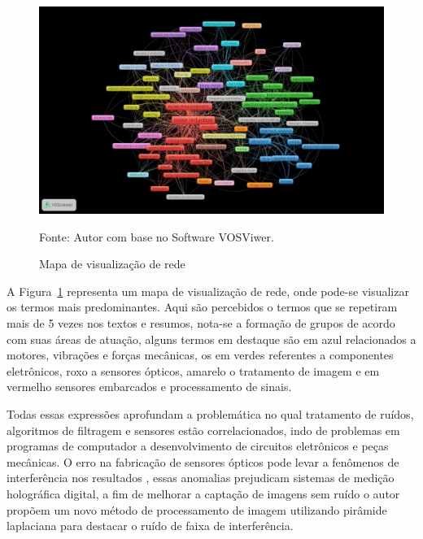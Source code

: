 \begin{figure}[H]
	\centering
	\includegraphics[width=15cm]{anexos/ris/IEEE/Noise_reduction_and_noise_abatement_andsensor_filtering_algorithm/network_visualization_with_lines.png}
	\caption{Mapa de visualização de rede}
	Fonte: Autor com base no Software VOSViwer.
	\label{fig: network_visualization_with_lines}
\end{figure}

A Figura~\ref{fig: network_visualization_with_lines} representa um mapa de visualização de rede, onde pode-se visualizar os termos mais predominantes. Aqui são percebidos o termos que se repetiram mais de 5 vezes nos textos e resumos, nota-se a formação de grupos de acordo com suas áreas de atuação, alguns termos em destaque são em azul relacionados a motores, vibrações e forças mecânicas, os em verdes referentes a componentes eletrônicos, roxo a sensores ópticos, amarelo o tratamento de imagem e em vermelho sensores embarcados e processamento de sinais. 


Todas essas expressões aprofundam a problemática no qual tratamento de ruídos, algoritmos de filtragem e sensores estão correlacionados, indo de problemas em programas de computador a desenvolvimento de circuitos eletrônicos e peças mecânicas. O erro na fabricação de sensores ópticos pode levar a fenômenos de interferência nos resultados \cite{liu_interference_stripe}, essas anomalias prejudicam sistemas de medição holográfica digital, a fim de melhorar a captação de imagens sem ruído o autor propõem um novo método de processamento de imagem utilizando pirâmide laplaciana para destacar o ruído de faixa de interferência.

